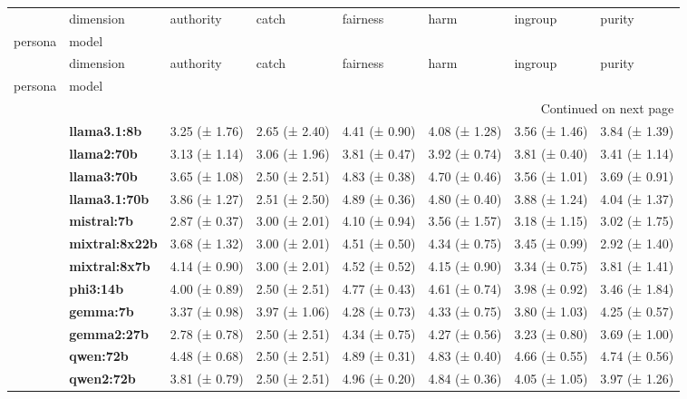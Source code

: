 \begin{longtable}{llllllll}
\toprule
 & dimension & authority & catch & fairness & harm & ingroup & purity \\
persona & model &  &  &  &  &  &  \\
\midrule
\endfirsthead
\toprule
 & dimension & authority & catch & fairness & harm & ingroup & purity \\
persona & model &  &  &  &  &  &  \\
\midrule
\endhead
\midrule
\multicolumn{8}{r}{Continued on next page} \\
\midrule
\endfoot
\bottomrule
\endlastfoot
\multirow[t]{12}{*}{\textbf{base}} & \textbf{llama3.1:8b} & 3.25 (± 1.76) & 2.65 (± 2.40) & 4.41 (± 0.90) & 4.08 (± 1.28) & 3.56 (± 1.46) & 3.84 (± 1.39) \\
\textbf{} & \textbf{llama2:70b} & 3.13 (± 1.14) & 3.06 (± 1.96) & 3.81 (± 0.47) & 3.92 (± 0.74) & 3.81 (± 0.40) & 3.41 (± 1.14) \\
\textbf{} & \textbf{llama3:70b} & 3.65 (± 1.08) & 2.50 (± 2.51) & 4.83 (± 0.38) & 4.70 (± 0.46) & 3.56 (± 1.01) & 3.69 (± 0.91) \\
\textbf{} & \textbf{llama3.1:70b} & 3.86 (± 1.27) & 2.51 (± 2.50) & 4.89 (± 0.36) & 4.80 (± 0.40) & 3.88 (± 1.24) & 4.04 (± 1.37) \\
\textbf{} & \textbf{mistral:7b} & 2.87 (± 0.37) & 3.00 (± 2.01) & 4.10 (± 0.94) & 3.56 (± 1.57) & 3.18 (± 1.15) & 3.02 (± 1.75) \\
\textbf{} & \textbf{mixtral:8x22b} & 3.68 (± 1.32) & 3.00 (± 2.01) & 4.51 (± 0.50) & 4.34 (± 0.75) & 3.45 (± 0.99) & 2.92 (± 1.40) \\
\textbf{} & \textbf{mixtral:8x7b} & 4.14 (± 0.90) & 3.00 (± 2.01) & 4.52 (± 0.52) & 4.15 (± 0.90) & 3.34 (± 0.75) & 3.81 (± 1.41) \\
\textbf{} & \textbf{phi3:14b} & 4.00 (± 0.89) & 2.50 (± 2.51) & 4.77 (± 0.43) & 4.61 (± 0.74) & 3.98 (± 0.92) & 3.46 (± 1.84) \\
\textbf{} & \textbf{gemma:7b} & 3.37 (± 0.98) & 3.97 (± 1.06) & 4.28 (± 0.73) & 4.33 (± 0.75) & 3.80 (± 1.03) & 4.25 (± 0.57) \\
\textbf{} & \textbf{gemma2:27b} & 2.78 (± 0.78) & 2.50 (± 2.51) & 4.34 (± 0.75) & 4.27 (± 0.56) & 3.23 (± 0.80) & 3.69 (± 1.00) \\
\textbf{} & \textbf{qwen:72b} & 4.48 (± 0.68) & 2.50 (± 2.51) & 4.89 (± 0.31) & 4.83 (± 0.40) & 4.66 (± 0.55) & 4.74 (± 0.56) \\
\textbf{} & \textbf{qwen2:72b} & 3.81 (± 0.79) & 2.50 (± 2.51) & 4.96 (± 0.20) & 4.84 (± 0.36) & 4.05 (± 1.05) & 3.97 (± 1.26) \\
\cline{1-8}
\end{longtable}
